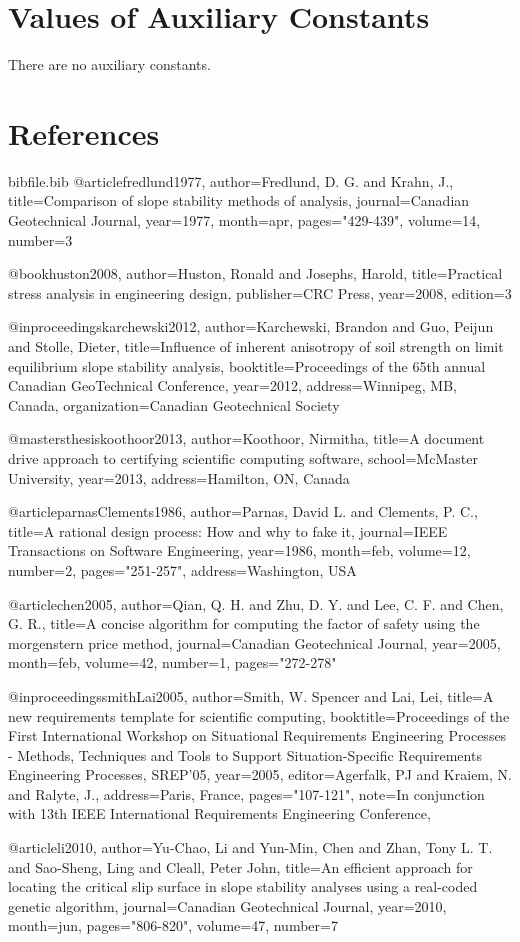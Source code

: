 \documentclass[12pt]{article}
\begin{document}
\section{Values of Auxiliary Constants}
\label{Sec:AuxConstants}
There are no auxiliary constants.
\section{References}
\label{Sec:References}
\begin{filecontents*}{bibfile.bib}
@article{fredlund1977,
author={Fredlund, D. G. and Krahn, J.},
title={Comparison of slope stability methods of analysis},
journal={Canadian Geotechnical Journal},
year={1977},
month={apr},
pages={"429-439"},
volume={14},
number={3}}

@book{huston2008,
author={Huston, Ronald and Josephs, Harold},
title={Practical stress analysis in engineering design},
publisher={CRC Press},
year={2008},
edition={3}}

@inproceedings{karchewski2012,
author={Karchewski, Brandon and Guo, Peijun and Stolle, Dieter},
title={Influence of inherent anisotropy of soil strength on limit equilibrium slope stability analysis},
booktitle={Proceedings of the 65th annual Canadian GeoTechnical Conference},
year={2012},
address={Winnipeg, MB, Canada},
organization={Canadian Geotechnical Society}}

@mastersthesis{koothoor2013,
author={Koothoor, Nirmitha},
title={A document drive approach to certifying scientific computing software},
school={McMaster University},
year={2013},
address={Hamilton, ON, Canada}}

@article{parnasClements1986,
author={Parnas, David L. and Clements, P. C.},
title={A rational design process: How and why to fake it},
journal={IEEE Transactions on Software Engineering},
year={1986},
month={feb},
volume={12},
number={2},
pages={"251-257"},
address={Washington, USA}}

@article{chen2005,
author={Qian, Q. H. and Zhu, D. Y. and Lee, C. F. and Chen, G. R.},
title={A concise algorithm for computing the factor of safety using the morgenstern price method},
journal={Canadian Geotechnical Journal},
year={2005},
month={feb},
volume={42},
number={1},
pages={"272-278"}}

@inproceedings{smithLai2005,
author={Smith, W. Spencer and Lai, Lei},
title={A new requirements template for scientific computing},
booktitle={Proceedings of the First International Workshop on Situational Requirements Engineering Processes - Methods, Techniques and Tools to Support Situation-Specific Requirements Engineering Processes, SREP'05},
year={2005},
editor={Agerfalk, PJ and Kraiem, N. and Ralyte, J.},
address={Paris, France},
pages={"107-121"},
note={In conjunction with 13th IEEE International Requirements Engineering Conference,}}

@article{li2010,
author={Yu-Chao, Li and Yun-Min, Chen and Zhan, Tony L. T. and Sao-Sheng, Ling and Cleall, Peter John},
title={An efficient approach for locating the critical slip surface in slope stability analyses using a real-coded genetic algorithm},
journal={Canadian Geotechnical Journal},
year={2010},
month={jun},
pages={"806-820"},
volume={47},
number={7}}
\end{filecontents*}
\nocite{*}
\printbibliography[heading=none]
\end{document}
